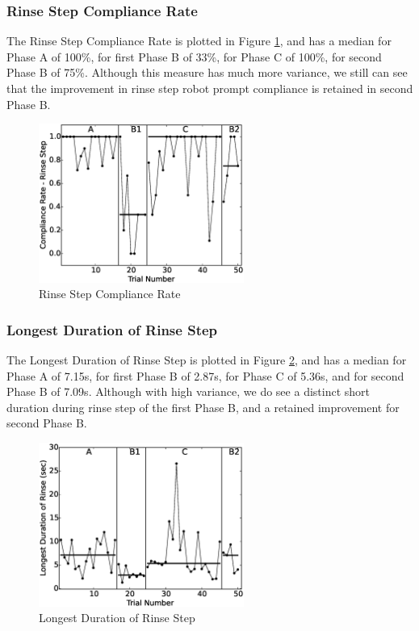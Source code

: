 \subsubsection{Rinse Step Compliance Rate}
The Rinse Step Compliance Rate is plotted in Figure \ref{fig:5ComplianceRate-RinseStep}, and has a median for Phase A of 100\%, for first Phase B of 33\%, for Phase C of 100\%, for second Phase B of 75\%.  Although this measure has much more variance, we still can see that the improvement in rinse step robot prompt compliance is retained in second Phase B.
\begin{figure} [h]
	\centering
	\includegraphics[width=0.6\textwidth]{./img/data_analysis/5ComplianceRate-RinseStep.eps}
	\caption{Rinse Step Compliance Rate}
	\label{fig:5ComplianceRate-RinseStep}
\end{figure}

\subsubsection{Longest Duration of Rinse Step}
The Longest Duration of Rinse Step is plotted in Figure \ref{fig:8LongestDurationofRinsesec}, and has a median for Phase A of 7.15s, for first Phase B of 2.87s, for Phase C of 5.36s, and for second Phase B of 7.09s.  Although with high variance, we do see a distinct short duration during rinse step of the first Phase B, and a retained improvement for second Phase B.
\begin{figure} [h]
	\centering
	\includegraphics[width=0.6\textwidth]{./img/data_analysis/8LongestDurationofRinsesec.eps}
	\caption{Longest Duration of Rinse Step}
	\label{fig:8LongestDurationofRinsesec}
\end{figure}

